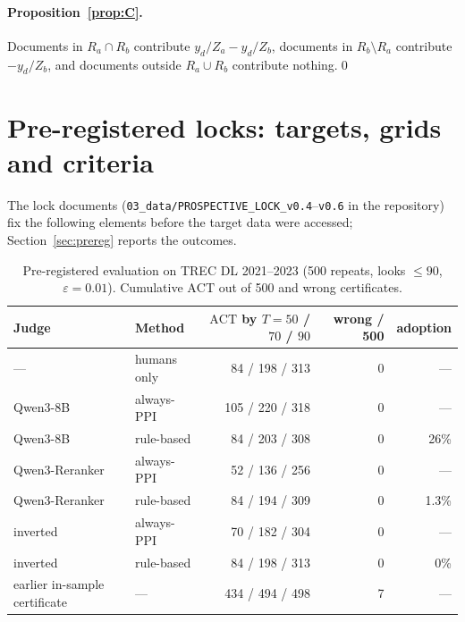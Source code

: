 \documentclass{article}
\newcommand{\eps}{\varepsilon}
\newcommand{\ACT}{\mathrm{ACT}}
\begin{document}
\paragraph{Proposition~\ref{prop:C}.} Documents in $R_a\cap R_b$ contribute $y_d/Z_a-y_d/Z_b$, documents in $R_b\setminus R_a$ contribute $-y_d/Z_b$, and documents outside $R_a\cup R_b$ contribute nothing.\qed

\section{Pre-registered locks: targets, grids and criteria}\label{app:locks}
The lock documents (\texttt{03\_data/PROSPECTIVE\_LOCK\_v0.4}--\texttt{v0.6} in the repository) fix the following elements before the target data were accessed; Section~\ref{sec:prereg} reports the outcomes.
\begin{table}[t]\centering\small
\caption{Pre-registered evaluation on TREC DL 2021--2023 (500 repeats, looks $\le90$, $\eps=0.01$). Cumulative $\ACT$ out of 500 and wrong certificates.}\label{tab:prereg}
\begin{tabular}{llrrr}\toprule
Judge & Method & $\ACT$ by $T{=}50$ / $70$ / $90$ & wrong / 500 & adoption\\\midrule
--- & humans only & 84 / 198 / 313 & 0 & ---\\
Qwen3-8B & always-PPI & 105 / 220 / 318 & 0 & ---\\
Qwen3-8B & rule-based & 84 / 203 / 308 & 0 & 26\%\\
Qwen3-Reranker & always-PPI & 52 / 136 / 256 & 0 & ---\\
Qwen3-Reranker & rule-based & 84 / 194 / 309 & 0 & 1.3\%\\
inverted & always-PPI & 70 / 182 / 304 & 0 & ---\\
inverted & rule-based & 84 / 198 / 313 & 0 & 0\%\\
earlier in-sample certificate & --- & 434 / 494 / 498 & 7 & ---\\\bottomrule
\end{tabular}
\end{table}
\end{document}
